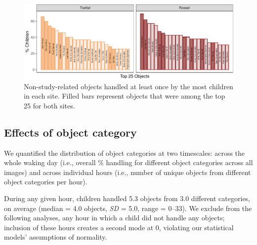 \documentclass[10pt, letterpaper]{article}
\newenvironment{CodeChunk}{}{}
\begin{document}
\begin{CodeChunk}
\begin{figure}[!ht]

{\centering \includegraphics{figs/top-objects-fig-1} 

}

\caption[Non-study-related objects handled at least once by the most children in each site]{Non-study-related objects handled at least once by the most children in each site. Filled bars represent objects that were among the top 25 for both sites.}\label{fig:top-objects-fig}
\end{figure}
\end{CodeChunk}

\hypertarget{effects-of-object-category}{%
\subsection{Effects of object
category}\label{effects-of-object-category}}

We quantified the distribution of object categories at two timescales:
across the whole waking day (i.e., overall \% handling for different
object categories across all images) and across individual hours (i.e.,
number of unique objects from different object categories per hour).

During any given hour, children handled 5.3 objects from 3.0 different
categories, on average (median = 4.0 objects, \emph{SD} = 5.0, range =
0--33). We exclude from the following analyses, any hour in which a
child did not handle any objects; inclusion of these hours creates a
second mode at 0, violating our statistical models' assumptions of
normality.
\end{document}
